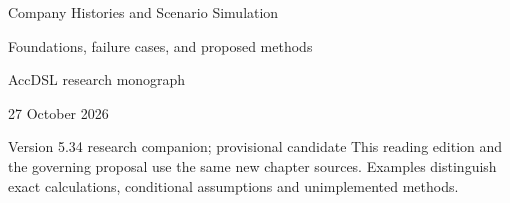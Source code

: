 \documentclass[11pt,a4paper]{report}
\begin{document}
\hypersetup{pageanchor=false}
\begin{titlepage}
{\Huge Company Histories and Scenario Simulation\par}
\vspace{12mm}
{\Large Foundations, failure cases, and proposed methods\par}
\vspace{8mm}
AccDSL research monograph\par 27 October 2026\par Version 5.34 research companion; provisional candidate
\vfill
This reading edition and the governing proposal use the same new chapter sources. Examples distinguish exact calculations, conditional assumptions and unimplemented methods.
\end{titlepage}
\hypersetup{pageanchor=true}
\tableofcontents
\clearpage{}


























\clearpage\label{sim:body-end}

\begingroup\raggedright
\endgroup
\end{document}
